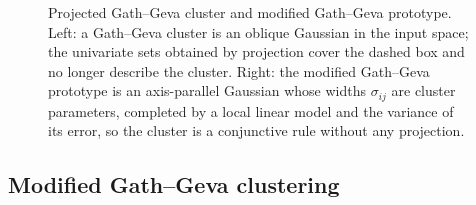 \begin{figure}[htbp]
\caption[Projected Gath--Geva cluster and modified Gath--Geva prototype.]{Projected Gath--Geva cluster and modified Gath--Geva prototype. Left: a Gath--Geva cluster is an oblique Gaussian in the input space; the univariate sets obtained by projection cover the dashed box and no longer describe the cluster. Right: the modified Gath--Geva prototype is an axis-parallel Gaussian whose widths $\sigma_{ij}$ are cluster parameters, completed by a local linear model and the variance of its error, so the cluster is a conjunctive rule without any projection.}
\label{fig:models:projection}
\end{figure}

\subsection{Modified Gath--Geva clustering}\label{sec:models:mgg}

